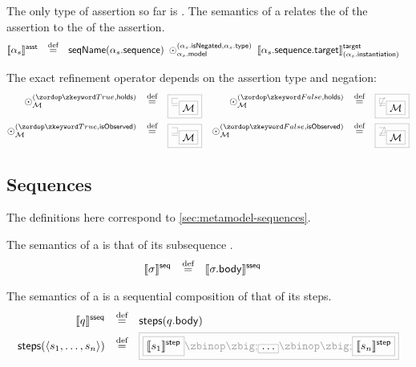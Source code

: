 \begin{definition}[\massertion]

\newcommand{\refop}[3]{\mathbin{\odot_{#1}^{(#2, #3)}}}

The only type of assertion so far is \msequenceassertion.  The semantics of a
\msequenceassertion{} relates the \msequence{} of the assertion to the
\mtarget{} of the assertion.
%
\begin{align*}
	\asstsema{\asasst}
\quad\defeq\quad&
	\seqnameOf{\field{\asasst}{sequence}}
	\;
	\refop{\field{\asasst}{model}}{\field{\asasst}{isNegated}}{\field{\asasst}{type}}
	\;
	\targetsema{\field{\field{\asasst}{sequence}}{target}}{\field{\asasst}{instantiation}}
\end{align*}

The exact refinement operator depends on the assertion type and negation:
%
\begin{align*}
	\refop{\amodel}{\true}{\mathsf{holds}}
\quad\defeq\quad&
	\tlang{\sqsubseteq_{\olang{\amodel}}}
&
	\refop{\amodel}{\false}{\mathsf{holds}}
\quad\defeq\quad&
	\tlang{\not\sqsubseteq_{\olang{\amodel}}}
\\
	\refop{\amodel}{\true}{\mathsf{isObserved}}
\quad\defeq\quad&
	\tlang{\sqsupseteq_{\olang{\amodel}}}
&
	\refop{\amodel}{\false}{\mathsf{isObserved}}
\quad\defeq\quad&
	\tlang{\not\sqsupseteq_{\olang{\amodel}}}
\\
\end{align*}
\end{definition}


\subsection{Sequences}\label{ssec:semantics-tockcsp-sequences}

The definitions here correspond to \cref{sec:metamodel-sequences}.

\begin{definition}[\msequence]

The semantics of a \msequence{} is that of its subsequence
.
%
\begin{align*}
	\llbracket \sigma \rrbracket^{\mathsf{seq}}
\quad\mathbin{\overset{\text{def}}=}\quad&	
	\llbracket \sigma.\mathsf{body} \rrbracket^{\mathsf{sseq}}
\end{align*}

\end{definition}

\begin{definition}[\msubsequence]

The semantics of a \msubsequence{} is a sequential composition of that of its steps.
%
\begin{align*}
	\sseqsema{\asseq}
	\quad\defeq\quad&	
	\funcname{steps}(\field{\asseq}{body})
\\
	\funcname{steps}(\langle \astep_1, \dotsc, \astep_n \rangle)
	\quad\defeq\quad&	
	\tlang{
	\olang{\stepsema{\astep_1}}
	\circseq
	\olang{\dotso}
	\circseq
	\olang{\stepsema{\astep_n}}
	}
\end{align*}

\end{definition}

